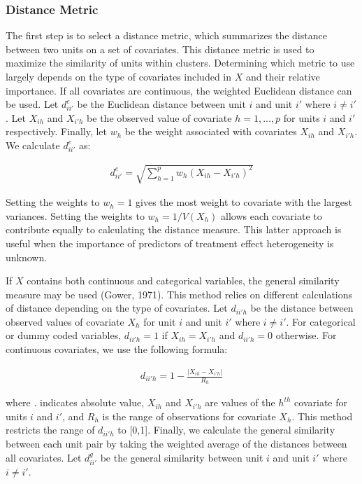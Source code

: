 \documentclass[man,floatsintext]{apa6}
\theoremstyle{definition}
\theoremstyle{definition}
\theoremstyle{definition}
\theoremstyle{remark}
\begin{document}
\hypertarget{distance-metric}{%
\subsubsection{Distance Metric}\label{distance-metric}}

The first step is to select a distance metric, which summarizes the
distance between two units on a set of covariates. This distance metric
is used to maximize the similarity of units within clusters. Determining
which metric to use largely depends on the type of covariates included
in \(X\) and their relative importance. If all covariates are
continuous, the weighted Euclidean distance can be used. Let
\(d^{e}_{ii'}\) be the Euclidean distance between unit \(i\) and unit
\(i'\) where \(i \ne i'\). Let \(X_{ih}\) and \(X_{i'h}\) be the
observed value of covariate \(h = {1, ..., p}\) for units \(i\) and
\(i'\) respectively. Finally, let \(w_h\) be the weight associated with
covariates \(X_{ih}\) and \(X_{i'h}\). We calculate \(d^{e}_{ii'}\) as:

\begin{align}
  d^{e}_{ii'} = \sqrt{\sum^{p}_{h=1} w_h (X_{ih} - X_{i'h})^2}
\end{align}

Setting the weights to \(w_h = 1\) gives the most weight to covariate
with the largest variances. Setting the weights to \(w_h = 1/V(X_h)\)
allows each covariate to contribute equally to calculating the distance
measure. This latter approach is useful when the importance of
predictors of treatment effect heterogeneity is unknown.

If \(X\) contains both continuous and categorical variables, the general
similarity measure may be used (Gower, 1971). This method relies on
different calculations of distance depending on the type of covariates.
Let \(d_{ii'h}\) be the distance between observed values of covariate
\(X_{h}\) for unit \(i\) and unit \(i'\) where \(i \ne i'\). For
categorical or dummy coded variables, \(d_{ii'h} = 1\) if
\(X_{ih} = X_{i'h}\) and \(d_{ii'h} = 0\) otherwise. For continuous
covariates, we use the following formula:

\begin{align}
  d_{ii'h} = 1 - \frac{|X_{ih} - X_{i'h}|}{R_h}
\end{align}

where \textbar{}.\textbar{} indicates absolute value, \(X_{ih}\) and
\(X_{i'h}\) are values of the \(h^{th}\) covariate for units \(i\) and
\(i'\), and \(R_h\) is the range of observations for covariate \(X_h\).
This method restricts the range of \(d_{ii'h}\) to {[}0,1{]}. Finally,
we calculate the general similarity between each unit pair by taking the
weighted average of the distances between all covariates. Let
\(d^{g}_{ii'}\) be the general similarity between unit \(i\) and unit
\(i'\) where \(i \ne i'\).
\end{document}
